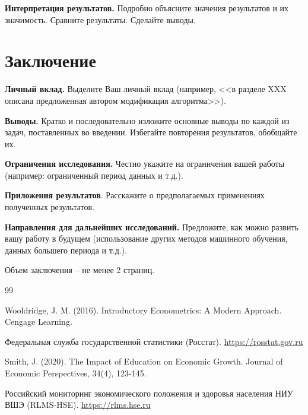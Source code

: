 \documentclass[a4paper,12pt]{article}
\begin{document}
\textbf{Интерпретация результатов.} Подробно объясните значения результатов и их значимость. Сравните результаты. Сделайте выводы.


\newpage

\section*{Заключение}

\textbf{Личный вклад.} Выделите Ваш личный вклад (например, <<в разделе XXX описана предложенная автором модификация алгоритма>>).

\textbf{Выводы.} Кратко и последовательно изложите основные выводы по каждой из задач, поставленных во введении. Избегайте повторения результатов, обобщайте их.

\textbf{Ограничения исследования.} Честно укажите на ограничения вашей работы (например: ограниченный период данных и т.д.).



\textbf{Приложения результатов}. Расскажите о предполагаемых применениях полученных результатов.


\textbf{Направления для дальнейших исследований.} Предложите, как можно развить вашу работу в будущем (использование других методов машинного обучения, данных большего периода и т.д.).

Объем заключения -- не менее 2 страниц.

\newpage

\begin{thebibliography}{99}

    Wooldridge, J. M. (2016). Introductory Econometrics: A Modern Approach. Cengage Learning.

    Федеральная служба государственной статистики (Росстат). \url{https://rosstat.gov.ru}

    Smith, J. (2020). The Impact of Education on Economic Growth. Journal of Economic Perspectives, 34(4), 123-145.

    Российский мониторинг экономического положения и здоровья населения НИУ ВШЭ (RLMS-HSE). \url{https://rlms.hse.ru}


\end{thebibliography}
\end{document}

